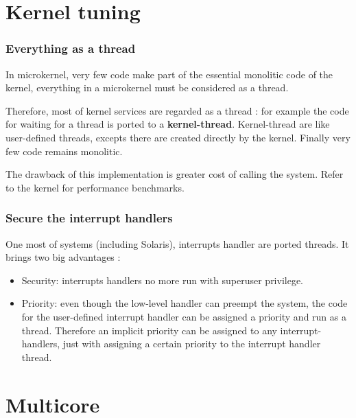 \section{Kernel tuning}


\begin{frame}
\frametitle{Everything as a thread}

In microkernel, very few code make part of the essential monolitic code of the kernel, everything in a microkernel must be considered as a thread.

\-

Therefore, most of kernel services are regarded as a thread : for example the code for waiting for a thread is ported to a \textbf{kernel-thread}. Kernel-thread are like user-defined threads, excepts there are created directly by the kernel. Finally very few code remains monolitic.

\-

The drawback of this implementation is greater cost of calling the system. Refer to the  kernel for performance benchmarks.

\end{frame}


\begin{frame}
\frametitle{Secure the interrupt handlers}

One most of systems (including Solaris), interrupts handler are ported threads. It brings two big advantages :

\begin{itemize}
\item
Security: interrupts handlers no more run with superuser privilege.
\item
Priority: even though the low-level handler can preempt the system, the code for the user-defined interrupt handler can be assigned a priority and run as a thread. Therefore an implicit priority can be assigned to any interrupt-handlers, just with assigning a certain priority to the interrupt handler thread.
\end{itemize}

\end{frame}



%
%

\section{Multicore}


